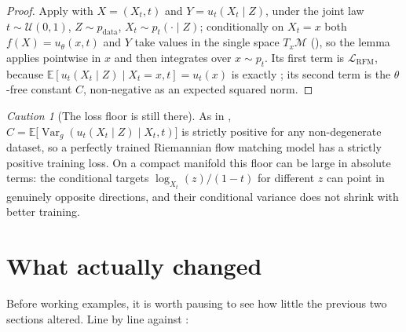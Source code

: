 \documentclass[11pt,a4paper]{report}
\theoremstyle{definition}
\theoremstyle{remark}
\newtheorem{caution}[caution]{Caution}
\DeclareMathOperator{\Var}{Var}
\newcommand{\EE}{\mathbb E}
\begin{document}
\begin{proof}
Apply  with $X=(X_t,t)$ and
$Y=u_t(X_t\mid Z)$, under the joint law $t\sim\mathcal U(0,1)$,
$Z\sim p_{\mathrm{data}}$, $X_t\sim p_t(\cdot\mid Z)$; conditionally on
$X_t=x$ both $f(X)=u_\theta(x,t)$ and $Y$ take values in the single space
$T_x\mathcal M$ (), so the lemma applies pointwise
in $x$ and then integrates over $x\sim p_t$. Its first term is
$\mathcal L_{\mathrm{RFM}}$, because
$\EE[u_t(X_t\mid Z)\mid X_t=x,t]=u_t(x)$ is exactly
; its second term is the $\theta$-free
constant $C$, non-negative as an expected squared norm.
\end{proof}

\begin{caution}[The loss floor is still there]
\label{caution:rcfm-floor}
As in , $C=\EE\bigl[\Var_{g}(u_t(X_t\mid Z)\mid X_t,t)\bigr]$
is strictly positive for any non-degenerate dataset, so a perfectly trained
Riemannian flow matching model has a strictly positive training loss. On a
compact manifold this floor can be large in absolute terms: the conditional
targets $\log_{X_t}(z)/(1-t)$ for different $z$ can point in genuinely
opposite directions, and their conditional variance does not shrink with
better training.
\end{caution}

\section{What actually changed}
\label{sec:rfm-what-changed}

Before working examples, it is worth pausing to see how little the previous
two sections altered. Line by line against :
\end{document}
